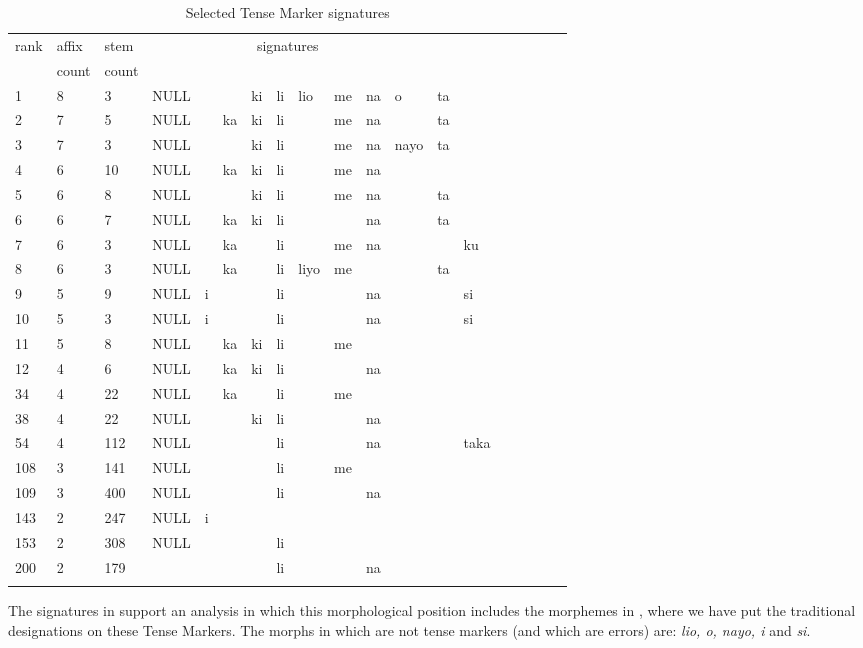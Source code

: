 \documentclass[output=paper,colorlinks,citecolor=brown]{langscibook}
\begin{document}
 
\begin{table}

\label{top-TM-sigs}
\begin{tabular}{lllllllllllllllllll}\lsptoprule
rank& affix & stem  & \multicolumn{9}{c}{signatures} \\
 & count & count    \\ \midrule
1 & 8 & 3 & NULL &     && ki & li & lio & me & na & o  & ta  \\
2 &  7 & 5 & NULL &&  ka & ki & li &     & me & na &    & ta  \\
3 &  7 & 3 & NULL &&     & ki & li &     & me & na &  nayo &  ta \\
4 &  6 & 10& NULL &&  ka & ki & li &     & me & na \\
5 &  6 &  8 & NULL &&     & ki & li &      & me &  na &&   ta\\
6 &  6 & 7 & NULL &&  ka & ki & li &     &    & na &  & ta \\
7 &  6 & 3 & NULL &&  ka & & li &     & me &  na &&& ku \\
8 &  6 & 3 & NULL &&  ka &    & li & liyo &  me &&&  ta\\
9 &  5 & 9 & NULL &  i  &    && li &&&  na &&&  si\\
10 & 5 & 3 & NULL&  i  &    && li &&& na &&& si \\
11 & 5 & 8 & NULL && ka & ki & li &     & me \\
12 & 4 & 6 & NULL && ka & ki & li & & & na \\
34 & 4 &22 & NULL &&  ka &    &li  & & me \\
38 & 4 &22 & NULL &&     &  ki &  li  &&& na \\
54& 4 & 112 & NULL &&     &    & li &&&  na  &&&  taka \\
108 & 3 & 141 & NULL &&  & & li  && me \\
109 & 3 &  400 & NULL && & &  li  &&& na  \\
143 & 2 &  247 & NULL &  i \\
153 & 2 &  308 & NULL &&  & & li \\
200 & 2 &179 &&   &  &  & li &&& na \\
  \lspbottomrule
\end{tabular}
\caption{Selected Tense Marker signatures}
\label{TM-sigs}
\end{table}
 

The signatures in  support an analysis in which this morphological position includes the morphemes in , where we have put the traditional designations on these Tense Markers. The morphs in  which are not tense markers (and which are errors) are: \textit{lio, o, nayo, i} and \textit{si}. 
 
\end{document}
